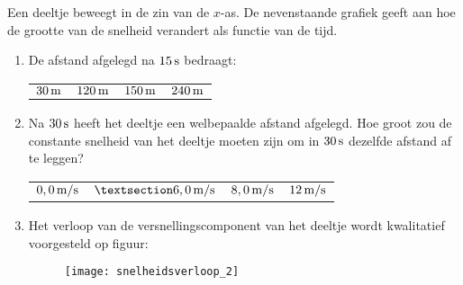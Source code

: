 \documentclass{ximera}
\begin{document}
\begin{exercise} 
\begin{minipage}[t]{0.6\textwidth}
Een deeltje beweegt in de zin van de $x$-as. De nevenstaande grafiek geeft aan hoe de grootte van de snelheid verandert als functie van de tijd.
\begin{enumerate}
\item De afstand afgelegd na $15\rm\,s$ bedraagt:
\newline
\begin{tabularx}{\textwidth}{XXXX}
$30\rm\,m$&$120\rm\,m$&$150\rm\,m$&$240\rm\,m$
\end{tabularx}
\item Na $30\rm\,s$ heeft het deeltje een welbepaalde afstand afgelegd. Hoe groot zou de constante snelheid van het deeltje moeten zijn om in $30\rm\,s$ dezelfde afstand af te leggen?
\newline
\begin{tabularx}{\textwidth}{XXXX}
$0,0\rm\,m/s$&$§6,0\rm\,m/s$&$8,0\rm\,m/s$&$12\rm\,m/s$
\end{tabularx}
\end{enumerate}
\end{minipage}
\hspace{2mm}
\begin{minipage}[t]{0.3\textwidth}
\end{minipage}
\begin{enumerate}
\setcounter{enumii}{2}
\item Het verloop van de versnellingscomponent van het deeltje wordt kwalitatief voorgesteld op figuur:
\begin{figure}[h]
\begin{flushright}
\texttt{[image: snelheidsverloop\_2]}
\end{flushright}
\end{figure}
\end{enumerate}

\end{exercise}
\end{document}
